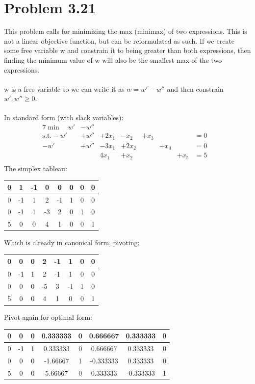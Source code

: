\documentclass[a4paper,12pt]{article}
\begin{document}
\section*{Problem 3.21}
This problem calls for minimizing the max (minimax) of two expressions. This is not a linear
objective function, but can be reformulated as such. If we create some free variable w and constrain
it to being greater than both expressions, then finding the minimum value of w will also be the
smallest max of the two expressions.\\\\
w is a free variable so we can write it as \(w = w' - w''\) and then constrain \( w', w'' \ge 0 \).\\\\
In standard form (with slack variables):
\begin{alignat*}{7}
  \min \quad w'& - w''& {}& {}& {}& {}& {}& {}&\\
  \text{s.t.} -w'& + w''& + 2x_1& - x_2& + x_3& {}& {}& = 0\\
  -w'& + w''& -3x_1& + 2x_2& {}& + x_4& {}& = 0\\
  {}& {}& 4x_1& + x_2& {}& {}& + x_5& = 5\\
\end{alignat*}
The simplex tableau:
\begin{center}
\begin{tabular}{| c | c  c  c  c  c  c  c |}
\hline
0 & 1 & -1 & 0 & 0 & 0 & 0 & 0\\
\hline
0 & -1 & 1 & 2 & -1 & 1 & 0 & 0\\
0 & -1 & 1 & -3 & 2 & 0 & 1 & 0\\
5 & 0 & 0 & 4 & 1 & 0 & 0 & 1\\
\hline
\end{tabular}
\end{center}
Which is already in canonical form, pivoting:
\begin{center}
\begin{tabular}{| c | c  c  c  c  c  c  c |}
\hline
0 & 0 & 0 & 2 & -1 & 1 & 0 & 0\\
\hline
0 & -1 & 1 & 2 & -1 & 1 & 0 & 0\\
0 & 0 & 0 & -5 & 3 & -1 & 1 & 0\\
5 & 0 & 0 & 4 & 1 & 0 & 0 & 1\\
\hline
\end{tabular}
\end{center}
Pivot again for optimal form:
\begin{center}
\begin{tabular}{| c | c  c  c  c  c  c  c |}
\hline
0 & 0 & 0 & 0.333333 & 0 & 0.666667 & 0.333333 & 0\\
\hline
0 & -1 & 1 & 0.333333 & 0 & 0.666667 & 0.333333 & 0\\
0 & 0 & 0 & -1.66667 & 1 & -0.333333 & 0.333333 & 0\\
5 & 0 & 0 & 5.66667 & 0 & 0.333333 & -0.333333 & 1\\
\hline
\end{tabular}
\end{center}
\end{document}
